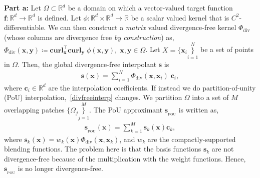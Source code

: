 \documentclass[12pt]{exam}
\def\R{\mathbb{R}}
\def\bx{\mathbf{x}}
\def\by{\mathbf{y}}
\def\bc{\mathbf{c}}
\def\bs{\mathbf{s}}
\def\bspou{\mathbf{s}_{_{\text{POU}}}}
\def\bof{\mathbf{f}}
\def\Phidiv{\Phi_{\text{div}}}
\def\curlx{\textbf{curl}_{\bx}}
\def\curly{\textbf{curl}_{\by}}
\begin{document}
\begin{questions}
{\bf Part a:} Let $\Omega \subset \R^{d}$ be a domain on which a vector-valued target function $\bof: \R^d \rightarrow \R^d$ is defined. Let $\phi: \R^d \times \R^d \rightarrow \R$ be a scalar valued kernel that is $C^2$-differentiable. We can then construct a \emph{matrix} valued divergence-free kernel $\Phidiv$ (whose columns are divergence free \emph{by construction}) as, $\Phidiv(\bx, \by) \coloneqq \curlx^{\top} \curly \; \phi(\bx, \by), \; \bx, \by \in \Omega$. Let $X = \{\bx_i \}\limits_{i=1}^{N}$ be a set of points in $\Omega$. Then, the global divergence-free interpolant $\bs$ is
\begin{align}
\bs(\bx) = \sum\limits_{i=1}^{N} \Phidiv(\bx, \bx_i) \; \bc_i, \label{divfreeinterp}
\end{align}
where $\bc_i \in \R^d$ are the interpolation coefficients. If instead we do partition-of-unity (PoU) interpolation,~\eqref{divfreeinterp} changes. We partition $\Omega$ into a set of $M$ overlapping patches $\{\Omega_j\}\limits_{j=1}^{M}$. The PoU approximant $\bspou$ is written as,
\begin{align}
\bspou(\bx) = \sum\limits_{k=1}^{M} \bs_k(\bx) \bc_k,
\end{align}
where $\bs_k(\bx) = w_k(\bx) \Phidiv(\bx, \bx_k)$, and $w_k$ are the compactly-supported blending functions. The problem here is that the basis functions $\bs_k$ are not divergence-free because of the multiplication with the weight functions. Hence, $\bspou$ is no longer divergence-free.


\end{questions}
\end{document}
